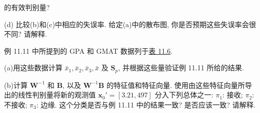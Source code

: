 
的有效判别量?

(d) 比较(b)和(c)中相应的失误率. 给定(a)中的散布图, 你是否预期这些失误率会很不同? 请解释.

\quad 例 11.11 中所提到的 GPA 和 GMAT 数据列于\hyperref[tab:11.6]{表 11.6}.

\noindent (a)\quad 用这些数据计算 $\bar{x}_1,\bar{x}_2,\bar{x}_3,\bar{x}$ 及 $\mathbf{S}_p$, 并根据这些量验证例 11.11 所给的结果.

\noindent (b)\quad 计算 $\mathbf{W}^{-1}$ 和 $\mathbf{B}$, 以及 $\mathbf{W}^{-1}\mathbf{B}$ 的特征值和特征向量. 使用由这些特征向量所导出的线性判别量将新的观测值 $\mathbf{x}_0'=[3.21,497]$ 分入下列总体之一: $\pi_1$: 接收; $\pi_2$: 不接收; $\pi_3$: 边缘. 这个分类是否与例 11.11 中的结果一致? 是否应该一致? 请解释.

